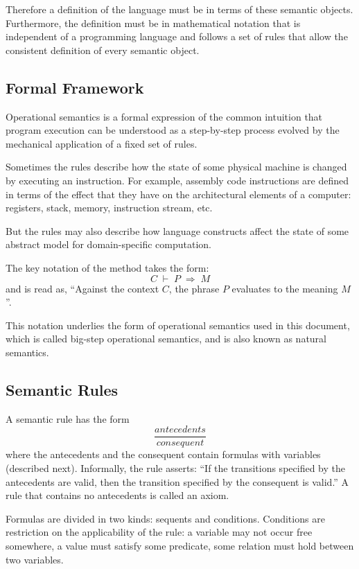 \documentclass[10pt]{article}
\begin{document}
Therefore a definition of the language must be in terms of these
semantic objects. Furthermore, the definition must be in mathematical
notation that is independent of a programming language and follows a
set of rules that allow the consistent definition of every semantic
object. 

\subsection*{Formal Framework}
Operational semantics is a formal expression of the common
intuition that program execution can be understood as a step-by-step
process evolved by the mechanical application of a fixed set of
rules. 

Sometimes the rules describe how the state of some physical machine is
changed by executing an instruction. For example, assembly code
instructions are defined in terms of the effect that they have on the
architectural elements of a computer: registers, stack, memory,
instruction stream, etc. 

But the rules may also describe how language constructs affect the
state of some abstract model for domain-specific computation. 

The key notation of the method takes the form: \begin{equation*}
C\;\vdash{}\;P\;\Rightarrow{}\;M\end{equation*}
 and is read as, ``Against the context $C$, the phrase $P$ evaluates to the meaning $M$''. 

This notation underlies the form of operational semantics used in
this document, which is called big-step operational semantics, and is
also known as natural semantics. 

\subsection*{Semantic Rules}
A semantic rule has the form \begin{equation*}
\frac{antecedents}%
{consequent}\end{equation*}
 where the antecedents and the consequent contain formulas with
variables (described next). Informally, the rule asserts: ``If the
transitions specified by the antecedents are valid, then the
transition specified by the consequent is valid.''  A rule that
contains no antecedents is called an axiom. 

Formulas are divided in two kinds: sequents and conditions.
Conditions are restriction on the applicability of the rule: a
variable may not occur free somewhere, a value must satisfy some
predicate, some relation must hold between two variables.  
\end{document}
